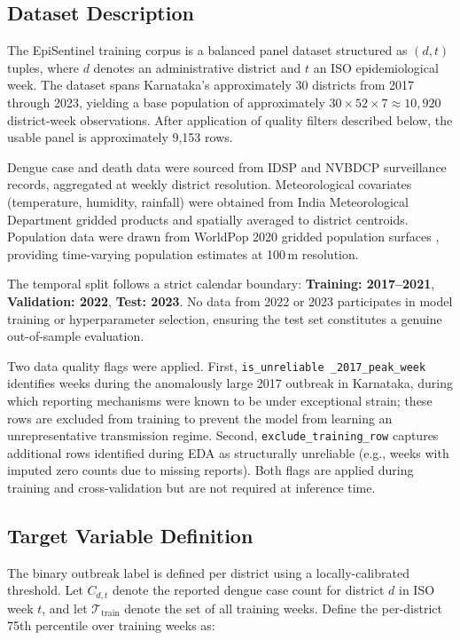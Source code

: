 \documentclass[conference]{IEEEtran}
\begin{document}
\subsection{Dataset Description}

The EpiSentinel training corpus is a balanced panel dataset
structured as $(d, t)$ tuples, where $d$ denotes an administrative
district and $t$ an ISO epidemiological week. The dataset spans
Karnataka's approximately 30 districts from 2017 through 2023, yielding
a base population of approximately $30 \times 52 \times 7 \approx 10{,}920$
district-week observations. After application of quality filters
described below, the usable panel is approximately 9,153 rows.

Dengue case and death data were sourced from IDSP and NVBDCP
surveillance records, aggregated at weekly district resolution.
Meteorological covariates (temperature, humidity, rainfall) were
obtained from India Meteorological Department gridded products
and spatially averaged to district centroids. Population data were
drawn from WorldPop 2020 gridded population surfaces
\cite{worldpop}, providing time-varying population estimates at
100\,m resolution.

The temporal split follows a strict calendar boundary:
\textbf{Training: 2017--2021}, \textbf{Validation: 2022},
\textbf{Test: 2023}. No data from 2022 or 2023 participates in
model training or hyperparameter selection, ensuring the test
set constitutes a genuine out-of-sample evaluation.

Two data quality flags were applied. First, \texttt{is\_unreliable
\_2017\_peak\_week} identifies weeks during the anomalously large
2017 outbreak in Karnataka, during which reporting mechanisms were
known to be under exceptional strain; these rows are excluded from
training to prevent the model from learning an unrepresentative
transmission regime. Second, \texttt{exclude\_training\_row} captures
additional rows identified during EDA as structurally unreliable
(e.g., weeks with imputed zero counts due to missing reports). Both
flags are applied during training and cross-validation but are not
required at inference time.

\subsection{Target Variable Definition}
\label{subsec:target}

The binary outbreak label is defined per district using a
locally-calibrated threshold. Let $C_{d,t}$ denote the reported
dengue case count for district $d$ in ISO week $t$, and let
$\mathcal{T}_{\text{train}}$ denote the set of all training weeks.
Define the per-district 75th percentile over training weeks as:
\end{document}
